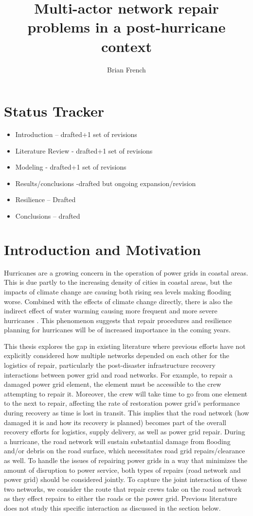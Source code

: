 \documentclass{article}
\begin{document}
	\title{Multi-actor network repair problems in a post-hurricane context}
	\author{Brian French}
	\maketitle
	\section{Status Tracker}
	\begin{itemize}
		\item Introduction -- drafted+1 set of revisions
		\item Literature Review - drafted+1 set of revisions
		\item Modeling - drafted+1 set of revisions
		\item Results/conclusions -drafted but ongoing expansion/revision
		\item Resilience -- Drafted
		\item Conclusions -- drafted
	\end{itemize}
	\doublespacing
	\section{Introduction and Motivation}
	Hurricanes are a growing concern in the operation of power grids in coastal areas. This is due partly to the increasing density of cities in coastal areas, but the impacts of climate change are causing both rising sea levels making flooding worse. Combined with the effects of climate change directly, there is also the indirect effect of water warming causing more frequent and more severe hurricanes \cite{MannEA2006}. This phenomenon suggests that repair procedures and resilience planning for hurricanes will be of increased importance in the coming years.
	
	This thesis explores the gap in existing literature where previous efforts have not explicitly considered how multiple networks depended on each other for the logistics of repair, particularly the post-disaster infrastructure recovery interactions between power grid and road networks. For example, to repair a damaged power grid element, the element must be accessible to the crew attempting to repair it. Moreover, the crew will take time to go from one element to the next to repair, affecting the rate of restoration power grid's performance during recovery as time is lost in transit. This implies that the road network (how damaged it is and how its recovery is planned) becomes part of the overall recovery efforts for logistics, supply delivery, as well as power grid repair. During a hurricane, the road network will sustain substantial damage from flooding and/or debris on the road surface, which necessitates road grid repairs/clearance as well. To handle the issues of repairing power grids in a way that minimizes the amount of disruption to power service, both types of repairs (road network and power grid) should be considered jointly. To capture the joint interaction of these two networks, we consider the route that repair crews take on the road network as they effect repairs to either the roads or the power grid. Previous literature does not study this specific interaction as discussed in the section below.
\end{document}
